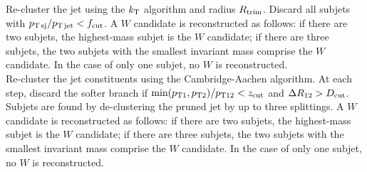  Re-cluster the jet using the $k_{\rm T}$ algorithm and radius $R_{\rm trim}$. Discard all subjets with $p_{\rm T\,sj}/p_{\rm T\,jet} < f_{\rm cut}$. A $W$ candidate is reconstructed as follows: if there are two subjets, the highest-mass subjet is the $W$ candidate; if there are three subjets, the two subjets with the smallest invariant mass comprise the $W$ candidate. In the case of only one subjet, no $W$ is reconstructed.\\

 Re-cluster the jet constituents using the Cambridge-Aachen algorithm. At each step, discard the softer branch if $\mathrm{min}(p_{\rm T1},p_{\rm T2}) / p_{\rm T12} < z_{\rm cut}$ and $\Delta R_{12}>D_{\rm cut}$. Subjets are found by de-clustering the pruned jet by up to three splittings. A $W$ candidate is reconstructed as follows: if there are two subjets, the highest-mass subjet is the $W$ candidate; if there are three subjets, the two subjets with the smallest invariant mass comprise the $W$ candidate. In the case of only one subjet, no $W$ is reconstructed.
